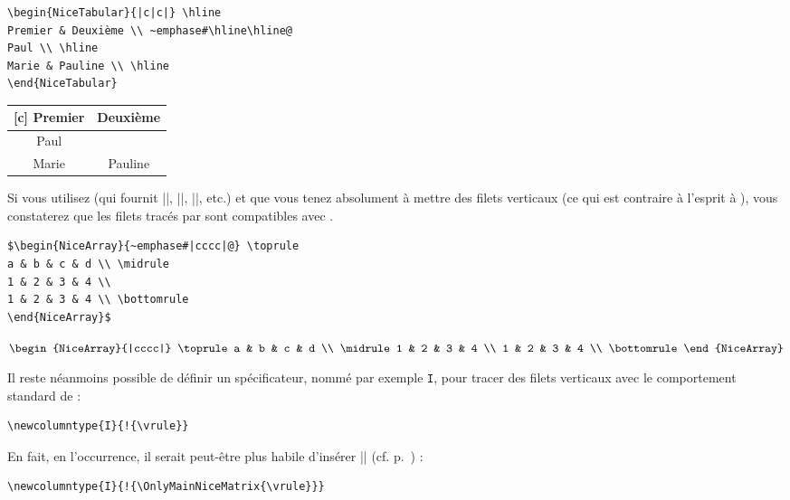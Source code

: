 \documentclass[dvipsnames]{article}%
\begin{document}
\bigskip
\begin{BVerbatim}[baseline=c,boxwidth=10cm]
\begin{NiceTabular}{|c|c|} \hline
Premier & Deuxième \\ ~emphase#\hline\hline@
Paul \\ \hline
Marie & Pauline \\ \hline
\end{NiceTabular}
\end{BVerbatim}
%
\begin{NiceTabular}{|c|c|}[c] \hline
Premier & Deuxième \\ \hline\hline
Paul \\ \hline
Marie & Pauline \\ \hline
\end{NiceTabular}


\bigskip
Si vous utilisez  (qui fournit |\toprule|, |\midrule|,
|\bottomrule|, etc.) et que vous tenez absolument à mettre des filets verticaux
(ce qui est contraire à l'esprit à ), vous constaterez que les
filets tracés par  sont compatibles avec .

\medskip
\begin{BVerbatim}[baseline=c,boxwidth=10.5cm]
$\begin{NiceArray}{~emphase#|cccc|@} \toprule
a & b & c & d \\ \midrule
1 & 2 & 3 & 4 \\
1 & 2 & 3 & 4 \\ \bottomrule
\end{NiceArray}$
\end{BVerbatim}
%
$\begin{NiceArray}{|cccc|}
\toprule
a & b & c & d \\
\midrule
1 & 2 & 3 & 4 \\
1 & 2 & 3 & 4 \\
\bottomrule
\end{NiceArray}$

\bigskip
Il reste néanmoins possible de définir un spécificateur, nommé par exemple
\verb|I|, pour tracer des filets verticaux avec le comportement standard de
 :
%
\begin{Verbatim}
\newcolumntype{I}{!{\vrule}}
\end{Verbatim}

En fait, en l'occurrence, il serait peut-être plus habile d'insérer
|\OnlyMainNiceMatrix| (cf. p.~\pageref{OnlyMainNiceMatrix}) :
\begin{Verbatim}
\newcolumntype{I}{!{\OnlyMainNiceMatrix{\vrule}}}
\end{Verbatim}
\end{document}
